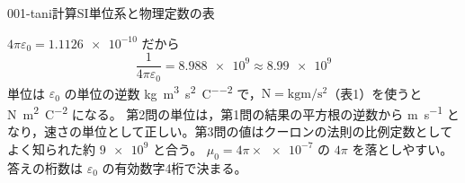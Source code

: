 \documentclass[uplatex,dvipdfmx,a4paper,11pt]{jsarticle}
\begin{document}
\begin{mondai}{001-tani}{計算}{SI単位系と物理定数の表}
\begin{tadashii}
 $4\pi\varepsilon_0 = \num{1.1126e-10}$ だから
\[ \frac{1}{4\pi\varepsilon_0} = \num{8.988e9} \approx \num{8.99e9} \]
単位は $\varepsilon_0$ の単位の逆数 \unit{\kilogram\metre\cubed\per\second\squared\per\coulomb\squared} で，$\unit{\newton} = \unit{\kilogram\metre\per\second\squared}$（表1）を使うと \unit{\newton\metre\squared\per\coulomb\squared} になる。
\kenzan 第2問の単位は，第1問の結果の平方根の逆数から \unit{\metre\per\second} となり，速さの単位として正しい。第3問の値はクーロンの法則の比例定数としてよく知られた約 $\num{9e9}$ と合う。
\tsumazuki $\mu_0 = 4\pi\times\num{e-7}$ の $4\pi$ を落としやすい。答えの桁数は $\varepsilon_0$ の有効数字4桁で決まる。
\end{tadashii}
\end{mondai}

\noteowari
\end{document}
